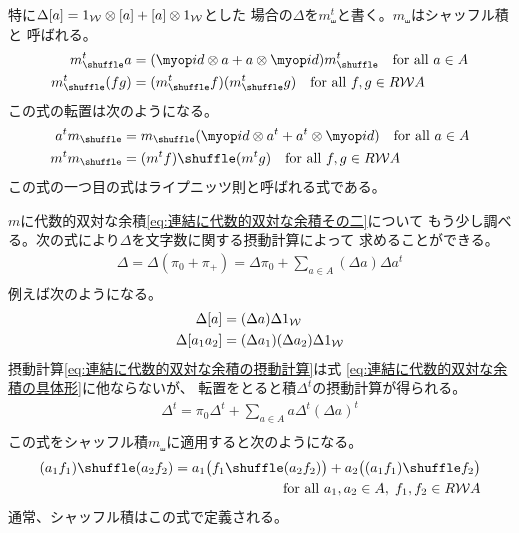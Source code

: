 	特に$\Delta[{a}]=1_{\mathcal{W}{}}\otimes[{a}]+[{a}]\otimes1_{\mathcal{W}{}}$とした
	場合の$\Delta$を$m_\shuffle^t$と書く。$m_\shuffle$はシャッフル積と
	呼ばれる。
	\begin{equation*}\begin{split} %
		m_\shuffle^ta &= (\myid\otimes a + a\otimes \myid)m_\shuffle^t
		\quad\text{for all }a\in A \\
		m_\shuffle^t(fg) &= (m_\shuffle^tf)(m_\shuffle^tg)
		\quad\text{for all }f,g\in R\Word{A}
	\end{split}\end{equation*} %
	この式の転置は次のようになる。
	\begin{equation*}\begin{split} %
		a^tm_\shuffle &= m_\shuffle(\myid\otimes a^t + a^t\otimes \myid)
		\quad\text{for all }a\in A \\
		m^tm_\shuffle &= (m^tf)\shuffle(m^tg)
		\quad\text{for all }f,g\in R\Word{A}
	\end{split}\end{equation*} %
	この式の一つ目の式はライプニッツ則と呼ばれる式である。

	$m$に代数的双対な余積\eqref{eq:連結に代数的双対な余積その二}について
	もう少し調べる。次の式により$\Delta$を文字数に関する摂動計算によって
	求めることができる。
	\begin{equation}\label{eq:連結に代数的双対な余積の摂動計算}\begin{split} %
		\Delta = \Delta(\pi_0+\pi_+) 
		= \Delta\pi_0+\sum_{a\in A}(\Delta a)\Delta a^t \\
	\end{split}\end{equation} %
	例えば次のようになる。
	\begin{equation*}\begin{split} %
		\Delta\word{a} &= (\Delta a)\Delta\wordu{} \\
		\Delta\word{a_1a_2} &= (\Delta a_1)(\Delta a_2)\Delta\wordu{} \\
	\end{split}\end{equation*} %
	摂動計算\eqref{eq:連結に代数的双対な余積の摂動計算}は式
	\eqref{eq:連結に代数的双対な余積の具体形}に他ならないが、
	転置をとると積$\Delta^t$の摂動計算が得られる。
	\begin{equation}\label{eq:連結に代数的双対な積の摂動計算}\begin{split} %
		\Delta^t = \pi_0\Delta^t + \sum_{a\in A}a\Delta^t (\Delta a)^t \\
	\end{split}\end{equation} %
	この式をシャッフル積$m_\shuffle$に適用すると次のようになる。
	\begin{equation*}\begin{split} %
		(a_1f_1)\shuffle (a_2f_2)
		= a_1\bigl(f_1\shuffle (a_2f_2)\bigr)
		+ a_2\bigl((a_1f_1)\shuffle f_2\bigr) \\
		\quad\text{for all }a_1,a_2\in A,\;f_1,f_2\in R\Word{A}
	\end{split}\end{equation*} %
	通常、シャッフル積はこの式で定義される。

